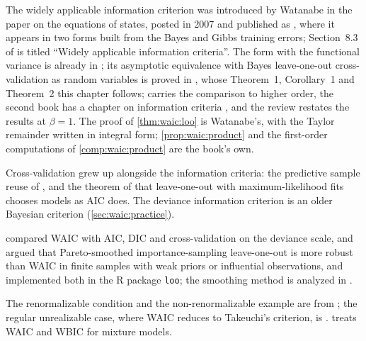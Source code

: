 \begin{refsection}
The widely applicable information criterion was introduced by Watanabe in the paper on the equations of states, posted in 2007 and published as \textcite{Watanabe2010a}, where it appears in two forms built from the Bayes and Gibbs training errors; Section~8.3 of \textcite{Watanabe2009} is titled ``Widely applicable information criteria''. The form with the functional variance is already in \textcite{Watanabe2010a,Watanabe2010b}; its asymptotic equivalence with Bayes leave-one-out cross-validation as random variables is proved in \textcite{Watanabe2010}, whose Theorem~1, Corollary~1 and Theorem~2 this chapter follows; \textcite{Watanabe2018b} carries the comparison to higher order, the second book has a chapter on information criteria \parencite[Chapter~8]{Watanabe2018}, and the review \textcite{Watanabe2024} restates the results at $\beta=1$. The proof of \cref{thm:waic:loo} is Watanabe's, with the Taylor remainder written in integral form; \cref{prop:waic:product} and the first-order computations of \cref{comp:waic:product} are the book's own.

Cross-validation grew up alongside the information criteria: the predictive sample reuse of \textcite{Geisser1975}, and the theorem of \textcite{Stone1977} that leave-one-out with maximum-likelihood fits chooses models as AIC \parencite{Akaike1974} does. The deviance information criterion \parencite{SpiegelhalterEtAl2002} is an older Bayesian criterion (\cref{sec:waic:practice}).

\textcite{GelmanEtAl2014} compared WAIC with AIC, DIC and cross-validation on the deviance scale, and \textcite{VehtariEtAl2017} argued that Pareto-smoothed importance-sampling leave-one-out is more robust than WAIC in finite samples with weak priors or influential observations, and implemented both in the R package \texttt{loo}; the smoothing method is analyzed in \textcite{VehtariEtAl2024}.

The renormalizable condition and the non-renormalizable example are from \textcite{Watanabe2010d}; the regular unrealizable case, where WAIC reduces to Takeuchi's criterion, is \textcite{Watanabe2010b}. \Textcite{Watanabe2021} treats WAIC and WBIC for mixture models.


\end{refsection}
